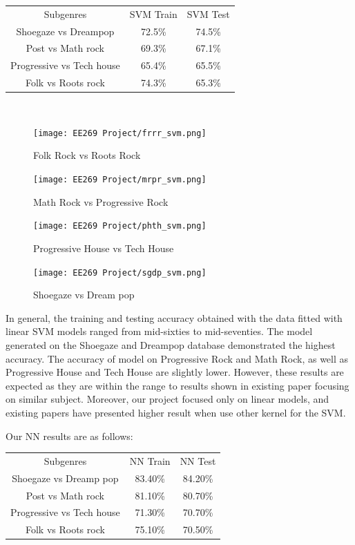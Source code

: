 \documentclass[letterpaper, 12 pt, conference]{ieeeconf}  %
\begin{document}
\begin{center}
    
    \begin{tabular}{ |c|c|c| }
 Subgenres & SVM Train & SVM Test \\ 
 Shoegaze vs Dreampop & 72.5\% & 74.5\% \\
 Post vs Math rock & 69.3\% & 67.1\% \\
 Progressive vs Tech house & 65.4\% & 65.5\% \\
 Folk vs Roots rock & 74.3\% & 65.3\% \\
\end{tabular}\\
\end{center}
\begin{figure}[t]
\texttt{[image: EE269 Project/frrr\_svm.png]}
\caption{Folk Rock vs Roots Rock}
\end{figure}
\begin{figure}
\texttt{[image: EE269 Project/mrpr\_svm.png]}
\caption{Math Rock vs Progressive Rock}
\end{figure}
\begin{figure}
\texttt{[image: EE269 Project/phth\_svm.png]}
\caption{Progressive House vs Tech House}
\end{figure}
\begin{figure}
\texttt{[image: EE269 Project/sgdp\_svm.png]}
\caption{Shoegaze vs Dream pop}
\end{figure}

\par In general, the training and testing accuracy obtained with the data fitted with linear SVM models ranged from mid-sixties to mid-seventies. The model generated on the Shoegaze and Dreampop database demonstrated the highest accuracy. The accuracy of model on Progressive Rock and Math Rock, as well as Progressive House and Tech House are slightly lower. However, these results are expected as they are within the range to results shown in existing paper focusing on similar subject. Moreover, our project focused only on linear models, and existing papers have presented higher result when use other kernel for the SVM. 
\newline \,\,



\par Our NN results are as follows:
\begin{center}
    
    \begin{tabular}{ |c|c|c| }
 Subgenres & NN Train & NN Test \\ 
 Shoegaze vs Dreamp pop &  83.40\% & 84.20\% \\
 Post vs Math rock & 81.10\% & 80.70\% \\
 Progressive vs Tech house & 71.30\% & 70.70\% \\
 Folk vs Roots rock & 75.10\% & 70.50\% \\
\end{tabular}\\
\end{center}
\end{document}
